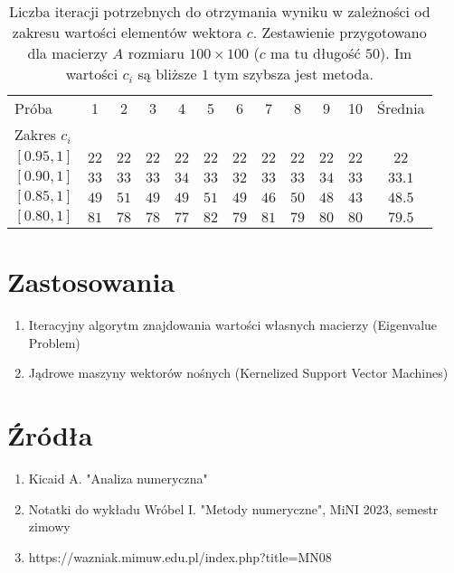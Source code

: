 \documentclass{article}
\begin{document}
	\begin{table}[h]
		\centering
		\begin{tabular}{|l|*{10}{c}|c|}
			\hline
			Próba & 1 & 2 & 3 & 4 & 5 & 6 & 7 & 8 & 9 & 10 & Średnia \\
			Zakres $c_i$ & & & & & & & & & & & \\
			\hline
			$[0.95, 1]$ & $22$ & $22$ & $22$ & $22$ & $22$ & $22$ & $22$ & $22$ & $22$ & $22$ & $22$ \\
			$[0.90, 1]$ & $33$ & $33$ & $33$ & $34$ & $33$ & $32$ & $33$ & $33$ & $34$ & $33$ & $33.1$ \\
			$[0.85, 1]$ & $49$ & $51$ & $49$ & $49$ & $51$ & $49$ & $46$ & $50$ & $48$ & $43$ & $48.5$ \\
			$[0.80, 1]$ & $81$ & $78$ & $78$ & $77$ & $82$ & $79$ & $81$ & $79$ & $80$ & $80$ & $79.5$ \\
			\hline
		\end{tabular}
		\caption{Liczba iteracji potrzebnych do otrzymania wyniku w zależności od zakresu wartości elementów wektora $c$. Zestawienie przygotowano dla macierzy $A$ rozmiaru $100 \times 100$ ($c$ ma tu długość $50$). Im wartości $c_i$ są bliższe $1$ tym szybsza jest metoda.}
	\end{table}

	\clearpage
	
	\section{Zastosowania}
	\begin{enumerate}
		\item Iteracyjny algorytm znajdowania wartości własnych macierzy (Eigenvalue Problem)
		\item Jądrowe maszyny wektorów nośnych (Kernelized Support Vector Machines)
	\end{enumerate}
	
	\section*{Źródła}
	\begin{enumerate}
		\item Kicaid A. "Analiza numeryczna"
		\item Notatki do wykładu Wróbel I. "Metody numeryczne", MiNI 2023, semestr zimowy
		\item https://wazniak.mimuw.edu.pl/index.php?title=MN08
	\end{enumerate}
	
\end{document}
